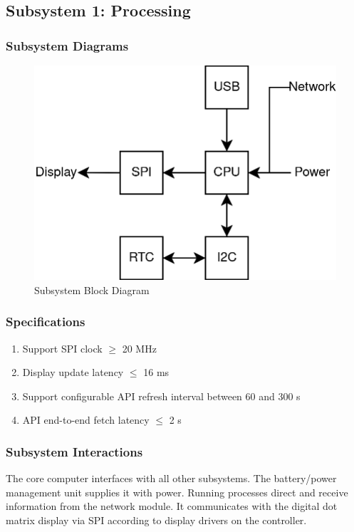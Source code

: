 \subsection{Subsystem 1: Processing}

\subsubsection{Subsystem Diagrams}
\begin{figure}[h]
    \centering
    \includegraphics[width=16cm]{images/Processing_Subsystem_Block_Diagram.png} %
    \caption{Subsystem Block Diagram}
\end{figure} %

\subsubsection{Specifications}
\begin{enumerate}
    \item Support SPI clock $\geq$ 20 MHz
    \item Display update latency $\leq$ 16 ms
    \item Support configurable API refresh interval between 60 and 300 s
    \item API end-to-end fetch latency $\leq$ 2 s
\end{enumerate}

\subsubsection{Subsystem Interactions}
The core computer interfaces with
all other subsystems. The battery/power
management unit supplies it with power.
Running processes direct and receive
information from the network module.
It communicates with the digital dot matrix
display via SPI according to display
drivers on the controller.


